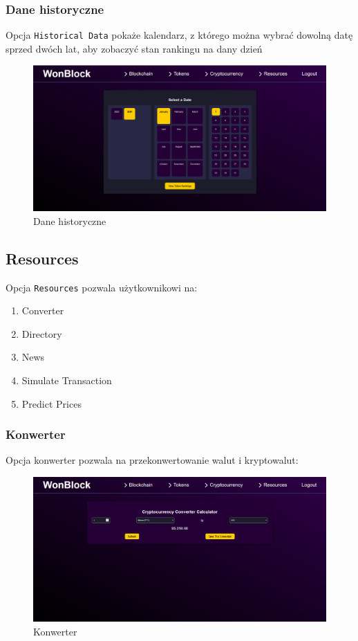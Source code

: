 \subsubsection{Dane historyczne}
Opcja \texttt{Historical Data} pokaże kalendarz, z którego można wybrać dowolną datę sprzed dwóch lat, aby zobaczyć stan rankingu na dany dzień
\begin{figure}[htb]
    \centering
    \includegraphics[width=0.8\linewidth]{./instrukcja/HistoricalData.png}
    \caption{Dane historyczne}
    \label{fig:Dane historyczne}
\end{figure}


\subsection{Resources}
Opcja \texttt{Resources} pozwala użytkownikowi na:
\begin{enumerate}
    \item Converter
    \item Directory
    \item News
    \item Simulate Transaction
    \item Predict Prices
\end{enumerate}
\subsubsection{Konwerter} 
Opcja konwerter pozwala na przekonwertowanie walut i kryptowalut:
\begin{figure}[htb]
    \centering
    \includegraphics[width=0.8\linewidth]{./instrukcja/Converter.png}
    \caption{Konwerter}
    \label{fig:Konwerter}
\end{figure}

